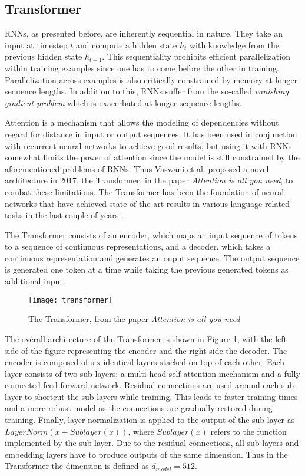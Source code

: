 \subsection{Transformer} \label{Transformer}
RNNs, as presented before, are inherently sequential in nature.
They take an input at timestep $t$ and compute a hidden state $h_t$ with knowledge from the previous hidden state $h_{t-1}$.
This sequentiality prohibits efficient parallelization within training examples since one has to come before the other in training.
Parallelization across examples is also critically constrained by memory at longer sequence lengths.
In addition to this, RNNs suffer from the so-called \textit{vanishing gradient problem} which is exacerbated at longer sequence lengths.
\cite{vaswani2017}

Attention is a mechanism that allows the modeling of dependencies without regard for distance in input or output sequences.
It has been used in conjunction with recurrent neural networks to achieve good results, but using it with RNNs somewhat limits the power of attention since the model is still constrained by the aforementioned problems of RNNs.
Thus Vaswani et al. proposed a novel architecture in 2017, the Transformer, in the paper \textit{Attention is all you need}, to combat these limitations.
The Transformer has been the foundation of neural networks that have achieved state-of-the-art results in various language-related tasks in the last couple of years \cite{vaswani2017}.

The Transformer consists of an encoder, which maps an input sequence of tokens to a sequence of continuous representations, and a decoder, which takes a continuous representation and generates an ouput sequence.
The output sequence is generated one token at a time while taking the previous generated tokens as additional input.

\begin{figure}[t]
\texttt{[image: transformer]}
\centering
\caption{The Transformer, from the paper \textit{Attention is all you need} \cite{vaswani2017}}
\label{fig:transformer}
\end{figure}

The overall architecture of the Transformer is shown in Figure \ref{fig:transformer}, with the left side of the figure representing the encoder and the right side the decoder.
The encoder is composed of six identical layers stacked on top of each other.
Each layer consists of two sub-layers; a multi-head self-attention mechanism and a fully connected feed-forward network.
Residual connections \cite{he2016} are used around each sub-layer to shortcut the sub-layers while training.
This leads to faster training times and a more robust model as the connections are gradually restored during training.
Finally, layer normalization is applied to the output of the sub-layer as $LayerNorm(x+Sublayer(x))$, where $Sublayer(x)$ refers to the function implemented by the sub-layer.
Due to the residual connections, all sub-layers and embedding layers have to produce outputs of the same dimension.
Thus in the Transformer the dimension is defined as $d_{model}=512$.

